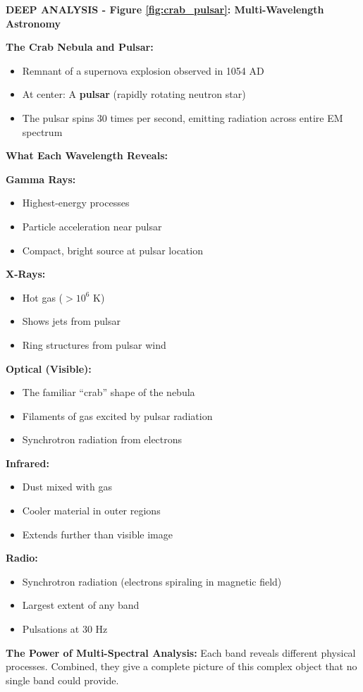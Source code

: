 \documentclass[12pt,a4paper]{article}
\begin{document}
\begin{deepexplanation}
\textbf{DEEP ANALYSIS - Figure \ref{fig:crab_pulsar}: Multi-Wavelength Astronomy}

\textbf{The Crab Nebula and Pulsar:}
\begin{itemize}
    \item Remnant of a supernova explosion observed in 1054 AD
    \item At center: A \textbf{pulsar} (rapidly rotating neutron star)
    \item The pulsar spins 30 times per second, emitting radiation across entire EM spectrum
\end{itemize}

\textbf{What Each Wavelength Reveals:}

\textbf{Gamma Rays:}
\begin{itemize}
    \item Highest-energy processes
    \item Particle acceleration near pulsar
    \item Compact, bright source at pulsar location
\end{itemize}

\textbf{X-Rays:}
\begin{itemize}
    \item Hot gas ($> 10^6$ K)
    \item Shows jets from pulsar
    \item Ring structures from pulsar wind
\end{itemize}

\textbf{Optical (Visible):}
\begin{itemize}
    \item The familiar ``crab'' shape of the nebula
    \item Filaments of gas excited by pulsar radiation
    \item Synchrotron radiation from electrons
\end{itemize}

\textbf{Infrared:}
\begin{itemize}
    \item Dust mixed with gas
    \item Cooler material in outer regions
    \item Extends further than visible image
\end{itemize}

\textbf{Radio:}
\begin{itemize}
    \item Synchrotron radiation (electrons spiraling in magnetic field)
    \item Largest extent of any band
    \item Pulsations at 30 Hz
\end{itemize}

\textbf{The Power of Multi-Spectral Analysis:}
Each band reveals different physical processes. Combined, they give a complete picture of this complex object that no single band could provide.
\end{deepexplanation}
\end{document}
